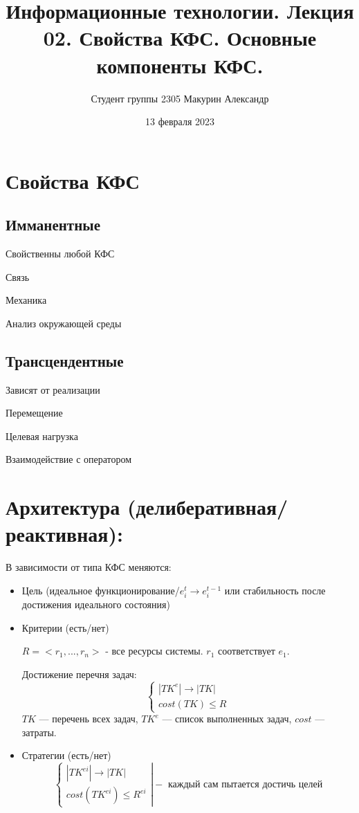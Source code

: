 \documentclass{article}
\title{Информационные технологии. Лекция 02. Свойства КФС. Основные компоненты КФС.}
\author{Студент группы 2305 Макурин Александр}
\date{13 февраля 2023}
\begin{document}
\maketitle
\begin{sloppypar}

    \section{Свойства КФС}
    \subsection{Имманентные}
    Свойственны любой КФС

    Связь

    Механика

    Анализ окружающей среды

    \subsection{Трансцендентные}
    Зависят от реализации

    Перемещение

    Целевая нагрузка

    Взаимодействие с оператором

    \section{Архитектура (делиберативная/реактивная):}
    В зависимости от типа КФС меняются:
    \begin{itemize}
        \item Цель (идеальное функционирование/$e_i^t \rightarrow e_i^{t - 1}$ или стабильность после достижения идеального состояния)
        \item Критерии (есть/нет)

              $R = <r_1, ..., r_n>$ - все ресурсы системы. $r_1$ соответствует $e_1$.

              Достижение перечня задач:
              \[
                  \left\{\begin{array}{ll}
                      |TK^e| \rightarrow |TK| \\
                      cost(TK) \leq R
                  \end{array}\right.
              \]
              $TK$ — перечень всех задач, $TK^e$ — список выполненных задач,
              $cost$ — затраты.
        \item Стратегии (есть/нет)
              \[
                  \left\{\begin{array}{ll}
                      |TK^{ei}| \rightarrow |TK| \\
                      cost(TK^{ei}) \leq R^{ei}
                  \end{array}\right|
                  - \text{ каждый сам пытается достичь целей}
              \]


\end{itemize}
\end{sloppypar}
\end{document}
